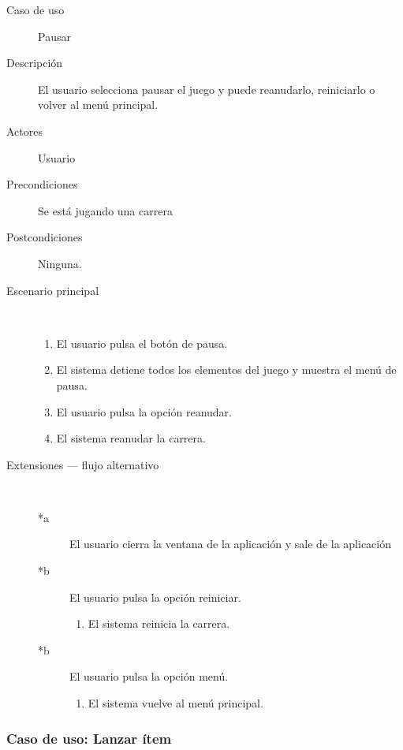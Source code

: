 \begin{description}
    \item[Caso de uso] Pausar
    \item[Descripción] El usuario selecciona pausar el juego y puede reanudarlo, reiniciarlo o volver al menú principal.
    \item[Actores] Usuario
    \item[Precondiciones] Se está jugando una carrera
    \item[Postcondiciones] Ninguna.
    \item[Escenario principal] $\quad$
        \begin{enumerate}
            \item El usuario pulsa el botón de pausa.
            \item El sistema detiene todos los elementos del juego y muestra el menú de pausa.
            \item El usuario pulsa la opción reanudar.
            \item El sistema reanudar la carrera.
        \end{enumerate}
    \item[Extensiones --- flujo alternativo] $\quad$
        \begin{description}
            \item[*a ] El usuario cierra la ventana de la aplicación y sale de la aplicación

            \item[*b] El usuario pulsa la opción reiniciar.
                \begin{enumerate}
                    \item El sistema reinicia la carrera.
                \end{enumerate}
                
            \item[*b] El usuario pulsa la opción menú.
                \begin{enumerate}
                    \item El sistema vuelve al menú principal.
                \end{enumerate}
        \end{description}
\end{description}

\subsubsection{Caso de uso: Lanzar ítem}


